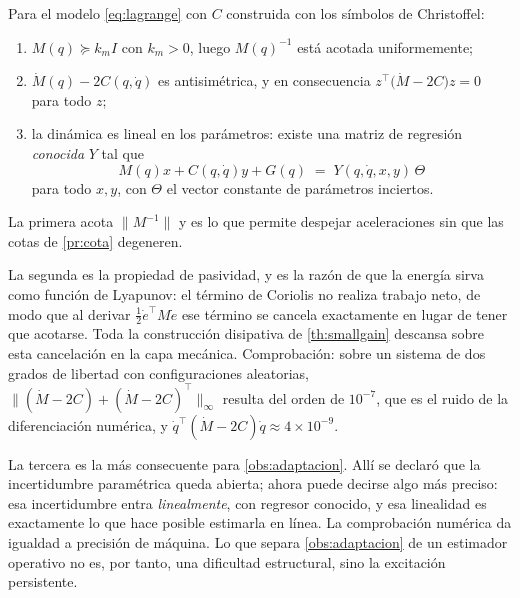 \begin{proposicion}
\label{pr:propiedades-el}
Para el modelo \eqref{eq:lagrange} con $C$ construida con los símbolos de
Christoffel:
\begin{enumerate}[label=(\roman*),leftmargin=2.2em,topsep=0.2em,itemsep=0.15em]
  \item $M(q)\succeq k_m I$ con $k_m>0$, luego $M(q)^{-1}$ está acotada
  uniformemente;
  \item $\dot M(q)-2C(q,\dot q)$ es antisimétrica, y en consecuencia
  $z^{\!\top}\bigl(\dot M-2C\bigr)z=0$ para todo $z$;
  \item la dinámica es lineal en los parámetros: existe una matriz de regresión
  \emph{conocida} $Y$ tal que
  \[
    M(q)x+C(q,\dot q)y+G(q)\;=\;Y(q,\dot q,x,y)\,\Theta
  \]
  para todo $x,y$, con $\Theta$ el vector constante de parámetros inciertos.
\end{enumerate}
\end{proposicion}

\begin{observacion}
\label{obs:propiedades-uso}
La primera acota $\lVert M^{-1}\rVert$ y es lo que permite despejar
aceleraciones sin que las cotas de \cref{pr:cota} degeneren.

La segunda es la propiedad de pasividad, y es la razón de que la energía sirva
como función de Lyapunov: el término de Coriolis no realiza trabajo neto, de modo
que al derivar $\tfrac12\dot e^{\!\top}M\dot e$ ese término se cancela
exactamente en lugar de tener que acotarse. Toda la construcción disipativa de
\cref{th:smallgain} descansa sobre esta cancelación en la capa mecánica.
Comprobación: sobre un sistema de dos grados de libertad con configuraciones
aleatorias, $\lVert(\dot M-2C)+(\dot M-2C)^{\!\top}\rVert_\infty$ resulta del
orden de $10^{-7}$, que es el ruido de la diferenciación numérica, y
$\dot q^{\!\top}(\dot M-2C)\dot q\approx4\times10^{-9}$.

La tercera es la más consecuente para \cref{obs:adaptacion}. Allí se declaró que
la incertidumbre paramétrica queda abierta; ahora puede decirse algo más
preciso: esa incertidumbre entra \emph{linealmente}, con regresor conocido, y esa
linealidad es exactamente lo que hace posible estimarla en línea. La
comprobación numérica da igualdad a precisión de máquina. Lo que separa
\cref{obs:adaptacion} de un estimador operativo no es, por tanto, una dificultad
estructural, sino la excitación persistente.
\end{observacion}

